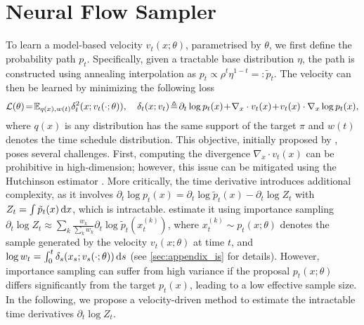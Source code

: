 \section{Neural Flow Sampler}
To learn a model-based velocity $v_t (x; \theta)$, parametrised by $\theta$, we first define the probability path $p_t$. Specifically, given a tractable base distribution $\eta$, the path is constructed using annealing interpolation as $p_t \propto \rho^t \eta^{1-t} =: \tilde{p}_t$. The velocity can then be learned by minimizing the following loss
\begin{align} \label{eq:nfs_loss}
    \mathcal{L}(\theta) \!=\! \E_{q(x),w(t)}  \delta_t^2(x;v_t(\cdot;\theta)), \quad \delta_t(x;v_t) \!\triangleq\! \partial_t \log p_t (x) \!+\! \nabla_x \cdot v_t (x) \!+\! v_t (x) \cdot \nabla_x \log p_t (x),
\end{align}
where $q(x)$ is any distribution has the same support of the target $\pi$ and $w(t)$ denotes the time schedule distribution.
This objective, initially proposed by \cite{tian2024liouville}, poses several challenges. First, computing the divergence $\nabla_x \cdot v_t (x)$ can be prohibitive in high-dimension; however, this issue can be mitigated using the Hutchinson estimator \citep{hutchinson1989stochastic}. More critically, the time derivative introduces additional complexity, as it involves $\partial_t \log p_t (x) = \partial_t \log \tilde{p}_t (x) - \partial_t \log Z_t$ with $Z_t = \int  \tilde{p}_t (x) \mathop{}\!\mathrm{d} x$, which is intractable. 
\cite{tian2024liouville} estimate it using importance sampling $\partial_t \log Z_t \approx \sum_k \frac{w_k}{\sum_k w_k} \partial_t \log \tilde{p}_t (x_t^{(k)})$, where $x_t^{(k)} \sim p_t (x;\theta)$ denotes the sample generated by the velocity $v_t (x;\theta)$ at time $t$, and $\log w_t = \int_0^t \delta_s (x_s;v_s(\cdot;\theta)) \mathop{}\!\mathrm{d} s$ (see \cref{sec:appendix_is} for details).
However, importance sampling can suffer from high variance if the proposal $p_t (x;\theta)$ differs significantly from the target $p_t (x)$, leading to a low effective sample size.
In the following, we propose a velocity-driven method to estimate the intractable time derivatives $\partial_t \log Z_t$.

